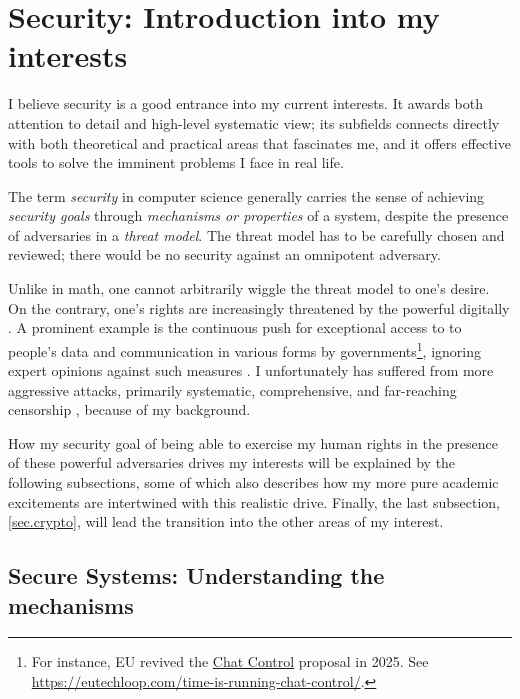 \documentclass{article}
\begin{document}
\section{Security: Introduction into my interests}
I believe security is a good entrance into my current interests. It awards both
attention to detail and high-level systematic view; its subfields connects
directly with both theoretical and practical areas that fascinates me, and it
offers effective tools to solve the imminent problems I face in real life. 

The term \emph{security} in computer science generally carries the sense of
achieving \emph{security goals} through \emph{mechanisms or properties} of a
system, despite the presence of adversaries in a \emph{threat model}. The
threat model has to be carefully chosen and reviewed; there would be no
security against an omnipotent adversary.

Unlike in math, one cannot arbitrarily wiggle the threat model to one's desire.
On the contrary, one's rights are increasingly threatened by the
powerful digitally \cite{eu.digital.1, eu.digital.2, internet.shutdown.2024}. A
prominent example is the continuous push for exceptional access to to people's
data and communication in various forms by governments\footnote{ For instance,
	EU revived the \href{
https://eur-lex.europa.eu/legal-content/EN/TXT/?uri=COM\%3A2022\%3A209\%3AFIN}
{Chat Control} proposal in 2025. See \url{
https://eutechloop.com/time-is-running-chat-control/}.}, ignoring expert
opinions against such measures \cite{keys.under.doormats, bugs.in.our.pockets,
chatcontrolchildprotection}.
I unfortunately has suffered from more aggressive attacks, primarily
systematic, comprehensive, and far-reaching censorship \cite{internet.coup}
\cite[Sect.~5]{chall.censor.circum}, because of my background.

How my security goal of being able to exercise my human rights in the presence of
these powerful adversaries drives my interests will be explained by the
following subsections, some of which also describes how my more pure academic
excitements are intertwined with this realistic drive. Finally, the last
subsection, \ref{sec.crypto}, will lead the transition into the other areas of
my interest.

\subsection{Secure Systems: Understanding the mechanisms} 
\label{sec.secure.systems}
\end{document}

